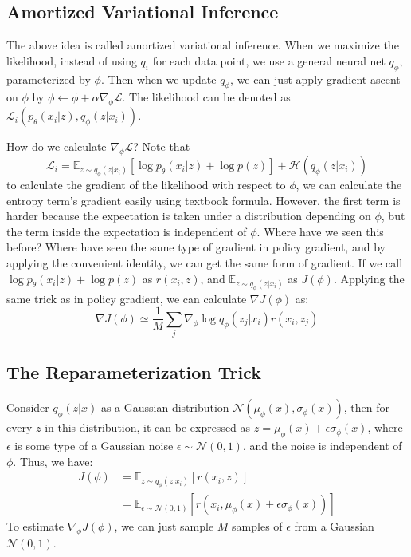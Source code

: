 \subsection{Amortized Variational Inference}
The above idea is called amortized variational inference. When we maximize the likelihood, instead of using $q_i$ for each data point, we use a general neural net $q_\phi$, parameterized by $\phi$. Then when we update $q_\phi$, we can just apply gradient ascent on $\phi$ by $\phi\leftarrow \phi + \alpha\nabla_\phi\mathcal{L}$. The likelihood can be denoted as $\mathcal{L}_i(p_\theta(x_i|z),q_\phi(z|x_i))$. 

How do we calculate $\nabla_\phi\mathcal{L}$? Note that 
\[
\mathcal{L}_i = \mathbb{E}_{z\sim q_\phi(z|x_i)}\left[\log p_\theta(x_i|z) + \log p(z)\right]+\mathcal{H}(q_\phi(z|x_i))
\]
to calculate the gradient of the likelihood with respect to $\phi$, we can calculate the entropy term's gradient easily using textbook formula. However, the first term is harder because the expectation is taken under a distribution depending on $\phi$, but the term inside the expectation is independent of $\phi$. Where have we seen this before? Where have seen the same type of gradient in policy gradient, and by applying the convenient identity, we can get the same form of gradient. If we call $\log p_\theta(x_i|z) + \log p(z)$ as $r(x_i,z)$, and $\mathbb{E}_{z\sim q_\phi(z|x_i)}$ as $J(\phi)$. Applying the same trick as in policy gradient, we can calculate $\nabla J(\phi)$ as:
\[
\nabla J(\phi)\simeq \frac{1}{M}\sum_j\nabla_\phi\log q_\phi(z_j|x_i)r(x_i,z_j)
\]
\subsection{The Reparameterization Trick}
Consider $q_\phi(z|x)$ as a Gaussian distribution $\mathcal{N}(\mu_\phi(x),\sigma_\phi(x))$, then for every $z$ in this distribution, it can be expressed as $z=\mu_\phi(x)+\epsilon\sigma_\phi(x)$, where $\epsilon$ is some type of a Gaussian noise $\epsilon \sim \mathcal{N}(0,1)$, and the noise is independent of $\phi$. Thus, we have:
\begin{align*}
    J(\phi) &= \mathbb{E}_{z\sim q_\phi(z|x_i)}[r(x_i,z)]\\
    &= \mathbb{E}_{\epsilon\sim \mathcal{N}(0,1)}\left[r(x_i,\mu_\phi(x)+\epsilon\sigma_\phi(x))\right]
\end{align*}
To estimate $\nabla_\phi J(\phi)$, we can just sample $M$ samples of $\epsilon$ from a Gaussian $\mathcal{N}(0,1)$.

